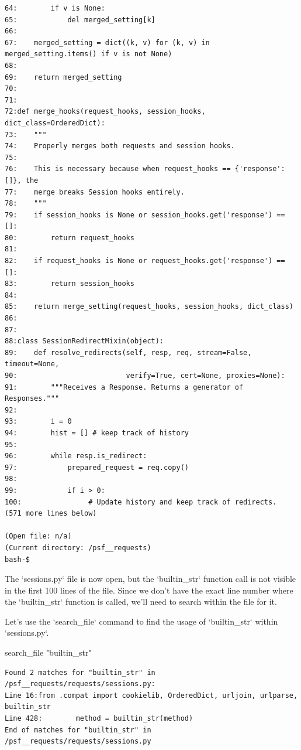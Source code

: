 {\begin{observationbox}
\begin{Verbatim}[breaklines=true, breakanywhere=true]
64:        if v is None:
65:            del merged_setting[k]
66:
67:    merged_setting = dict((k, v) for (k, v) in merged_setting.items() if v is not None)
68:
69:    return merged_setting
70:
71:
72:def merge_hooks(request_hooks, session_hooks, dict_class=OrderedDict):
73:    """
74:    Properly merges both requests and session hooks.
75:
76:    This is necessary because when request_hooks == {'response': []}, the
77:    merge breaks Session hooks entirely.
78:    """
79:    if session_hooks is None or session_hooks.get('response') == []:
80:        return request_hooks
81:
82:    if request_hooks is None or request_hooks.get('response') == []:
83:        return session_hooks
84:
85:    return merge_setting(request_hooks, session_hooks, dict_class)
86:
87:
88:class SessionRedirectMixin(object):
89:    def resolve_redirects(self, resp, req, stream=False, timeout=None,
90:                          verify=True, cert=None, proxies=None):
91:        """Receives a Response. Returns a generator of Responses."""
92:
93:        i = 0
94:        hist = [] # keep track of history
95:
96:        while resp.is_redirect:
97:            prepared_request = req.copy()
98:
99:            if i > 0:
100:                # Update history and keep track of redirects.
(571 more lines below)

(Open file: n/a)
(Current directory: /psf__requests)
bash-$
\end{Verbatim}
\end{observationbox}
\begin{agentbox}
The `sessions.py` file is now open, but the `builtin\_str` function call is not visible in the first 100 lines of the file. Since we don't have the exact line number where the `builtin\_str` function is called, we'll need to search within the file for it.



Let's use the `search\_file` command to find the usage of `builtin\_str` within `sessions.py`.

\hrulefill
\begin{CodeVerbatim}[breaklines=true, breakanywhere=true]
search_file "builtin_str"
\end{CodeVerbatim}
\end{agentbox}
\begin{observationbox}\begin{Verbatim}[breaklines=true, breakanywhere=true]
Found 2 matches for "builtin_str" in /psf__requests/requests/sessions.py:
Line 16:from .compat import cookielib, OrderedDict, urljoin, urlparse, builtin_str
Line 428:        method = builtin_str(method)
End of matches for "builtin_str" in /psf__requests/requests/sessions.py


\end{Verbatim}
\end{observationbox}}
